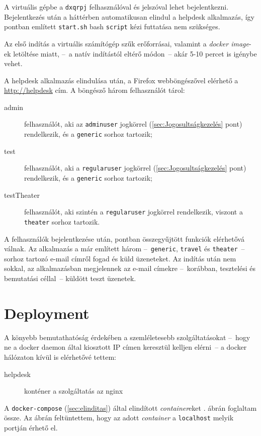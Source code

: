 A virtuális gépbe a \texttt{dxqrpj} felhasználóval és jelszóval lehet bejelentkezni. Bejelentkezés után a háttérben automatikusan elindul a helpdesk alkalmazás, így  pontban említett \texttt{start.sh} bash \texttt{script} kézi futtatása nem szükséges.

Az első indítás a virtuális számítógép szűk erőforrásai, valamint a \emph{docker image}-ek letöltése miatt, --~a natív indítástól eltérő módon~-- akár 5-10 percet is igénybe vehet.

A helpdesk alkalmazás elindulása után, a Firefox webböngészővel elérhető a \href{http://helpdesk}{http://helpdesk} cím. A böngésző három felhasználót tárol:
\begin{description}
	\item[admin] felhasználót, aki az \texttt{admin\textunderscore user} jogkörrel (\ref{sec:Jogosultságkezelés} pont) rendelkezik, és a \texttt{generic} sorhoz tartozik;
	\item[test] felhasználót, aki a \texttt{regular\textunderscore user} jogkörrel (\ref{sec:Jogosultságkezelés} pont) rendelkezik, és a \texttt{generic} sorhoz tartozik;
	\item[testTheater] felhasználót, aki szintén a \texttt{regular\textunderscore user} jogkörrel rendelkezik, viszont a \texttt{theater} sorhoz tartozik.
\end{description}
 
A felhasználók bejelentkezése után,  pontban összegyűjtött funkciók elérhetővá válnak. Az alkalmazás a már említett három --~\texttt{generic}, \texttt{travel} és \texttt{theater}~-- sorhoz tartozó e-mail címről fogad és küld üzeneteket. Az indítás után nem sokkal, az alkalmazásban megjelennek az e-mail címekre --~korábban, tesztelési és bemutatási céllal~-- küldött teszt üzenetek.



\section{Deployment}
A könyebb bemutathatóság érdekében a szemléletesebb szolgáltatásokat --~hogy ne a docker daemon által kiosztott IP címen keresztül kelljen elérni~-- a docker hálózaton kívül is elérhetővé tettem:
\begin{description}
	\item[helpdesk] konténer a szolgáltatás az nginx
\end{description}

A \texttt{docker-compose} (\ref{sec:elinditas}) által elindított \emph{container}eket . ábrán foglaltam össze. Az ábrán feltüntettem, hogy az adott \emph{container} a \texttt{localhost} melyik portján érhető el.


